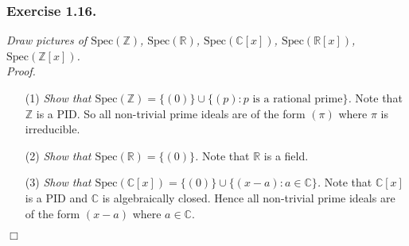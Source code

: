 \documentclass{article}
\begin{document}



\subsubsection*{Exercise 1.16.}
\emph{Draw pictures of
$\mathrm{Spec}(\mathbb{Z})$,
$\mathrm{Spec}(\mathbb{R})$,
$\mathrm{Spec}(\mathbb{C}[x])$,
$\mathrm{Spec}(\mathbb{R}[x])$,
$\mathrm{Spec}(\mathbb{Z}[x])$.} \\



\emph{Proof.}
\begin{enumerate}
\item[(1)]
  \emph{Show that $\mathrm{Spec}(\mathbb{Z}) = \{ (0) \} \cup \{ (p) : \text{$p$ is a rational prime} \}$.}
  Note that $\mathbb{Z}$ is a PID.
  So all non-trivial prime ideals are of the form $(\pi)$ where $\pi$ is irreducible.

\item[(2)]
  \emph{Show that $\mathrm{Spec}(\mathbb{R}) = \{ (0) \}$.}
  Note that $\mathbb{R}$ is a field.

\item[(3)]
  \emph{Show that $\mathrm{Spec}(\mathbb{C}[x]) = \{ (0) \} \cup \{ (x - a) : a \in \mathbb{C} \}$.}
  Note that $\mathbb{C}[x]$ is a PID and $\mathbb{C}$ is algebraically closed.
  Hence all non-trivial prime ideals are of the form $(x - a)$ where $a \in \mathbb{C}$.
\end{enumerate}
$\Box$ \\\\



\end{document}
